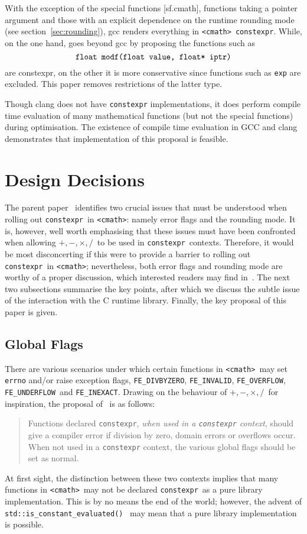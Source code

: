 \documentclass[prd,twocolumn,amsmath,amssymb,nofootinbib,eqsecnum]{revtex4-1}
\newcommand{\constexpr}{\code{constexpr}\xspace}
\newcommand{\code}[1]{{\tt #1}}
\newcommand{\header}[1]{{\tt <#1>}}
\newcommand{\cmath}{\header{cmath}}
\newcommand{\FEINVALID}{{\tt FE\_INVALID}}
\newcommand{\FEDIVBYZERO}{{\tt FE\_DIVBYZERO}}
\newcommand{\FEINEXACT}{{\tt FE\_INEXACT}}
\newcommand{\FEUNDERFLOW}{{\tt FE\_UNDERFLOW}}
\newcommand{\FEOVERFLOW}{{\tt FE\_OVERFLOW}}
\newcommand{\Operators}{\ensuremath{+,-,\times,/}}
\begin{document}
With the exception of the special functions [sf.cmath], functions taking a pointer argument and those with an explicit dependence on the runtime rounding mode (see section~\ref{sec:rounding}), gcc renders everything in \cmath\ \constexpr. While, on the one hand, \cite{Rosten-constexpr} goes beyond gcc by proposing the functions such as
\[
	\mbox{\code{float modf(float value, float* iptr)}}
\]
are constexpr, on the other it is more conservative since functions such as \code{exp} are excluded. This paper removes restrictions of the latter type.

Though clang does not have \constexpr implementations, it does perform compile time evaluation of many mathematical functions (but not the special functions) during optimisation. The existence of compile time evaluation in GCC and clang demonstrates that implementation of this proposal is feasible.


\section{Design Decisions}

The parent paper~\cite{Rosten-constexpr} identifies two crucial issues that must be understood when rolling out \constexpr\ in \cmath: namely error flags and the rounding mode. It is, however, well worth emphasising that these issues must have been confronted when allowing \Operators\ to be used in \constexpr\ contexts. Therefore, it would be most disconcerting if this were to provide a barrier to rolling out \constexpr\ in \cmath; nevertheless, both error flags and rounding mode are worthy of a proper discussion, which interested readers may find in~\cite{Rosten-constexpr}. The next two subsections summarise the key points, after which we discuss the subtle issue of the interaction with the C runtime library. Finally, the key proposal of this paper is given.

\subsection{Global Flags}

There are various scenarios under which certain functions in \cmath\ may set \code{errno} and/or raise exception flags, \FEDIVBYZERO, \FEINVALID, \FEOVERFLOW, \FEUNDERFLOW\ and
\FEINEXACT. Drawing on the behaviour of \Operators\ for inspiration, the proposal of~\cite{Rosten-constexpr} is as follows:
\begin{quotation}
	Functions declared \constexpr, \emph{when used in a \constexpr
context}, should give a compiler error if division by zero, domain errors or
overflows occur. When not used in a \constexpr context, the various global
flags should be set as normal.
\end{quotation}
At first sight, the distinction between these two contexts implies that many functions in \cmath\ may not be declared \constexpr\ as a pure library implementation. This is by no means the end of the world; however, the advent of \code{std::is\_constant\_evaluated()}~\cite{ConstEval}
may mean that a pure library implementation is possible.
\end{document}
